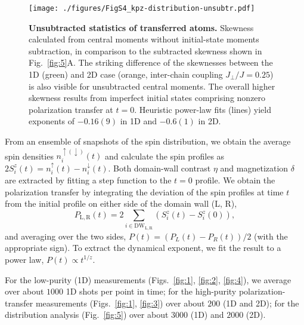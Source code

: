 \documentclass[
 reprint,
 superscriptaddress,
 amsmath,amssymb,
 aps,
 pra,
]{revtex4-2}
\begin{document}
\begin{figure}
    \centering
    \texttt{[image: ./figures/FigS4\_kpz-distribution-unsubtr.pdf]}
    \caption{\textbf{Unsubtracted statistics of transferred atoms.}
        Skewness calculated from central moments without initial-state moments subtraction, in comparison to the subtracted skewness shown in Fig.~\ref{fig:5}A.
        The striking difference of the skewnesses between the 1D (green) and 2D case (orange, inter-chain coupling $J_\perp / J = 0.25$) is also visible for unsubtracted central moments. The overall higher skewness results from imperfect initial states comprising nonzero polarization transfer at $t=0$.
        Heuristic power-law fits (lines) yield exponents of $-0.16(9)$ in 1D and $-0.6(1)$ in 2D.
    }
    \label{fig:kpz-distribution-unsubtr}
\end{figure}

From an ensemble of snapshots of the spin distribution, we obtain the average spin densities $n_i^{\uparrow (\downarrow)} (t)$ and calculate the spin profiles as $2 S_i^z (t) = n_i^\uparrow (t) - n_i^\downarrow (t)$.
Both domain-wall contrast $\eta$ and magnetization $\delta$ are extracted by fitting a step function to the $t = 0$ profile.
We obtain the polarization transfer by integrating the deviation of the spin profiles at time $t$ from the initial profile on either side of the domain wall (L, R),
\begin{equation}
    P_\mathrm{L,R} (t) = 2 \sum_{i \in \mathrm{DW}_\mathrm{L,R}} (S_i^z (t) - S_i^z (0)),
    \label{eq:pol-transfer}
\end{equation}
and averaging over the two sides, $P (t) = (P_L (t) - P_R (t)) / 2$ (with the appropriate sign).
To extract the dynamical exponent, we fit the result to a power law, $P (t) \propto t^{1 / z}$.

For the low-purity (1D) measurements (Figs.~\ref{fig:1}, \ref{fig:2}, \ref{fig:4}), we average over about $1000$ 1D shots per point in time; for the high-purity polarization-transfer measurements (Figs.~\ref{fig:1}, \ref{fig:3}) over about $200$ (1D and 2D); for the distribution analysis (Fig.~\ref{fig:5}) over about $3000$ (1D) and $2000$ (2D).
\end{document}
